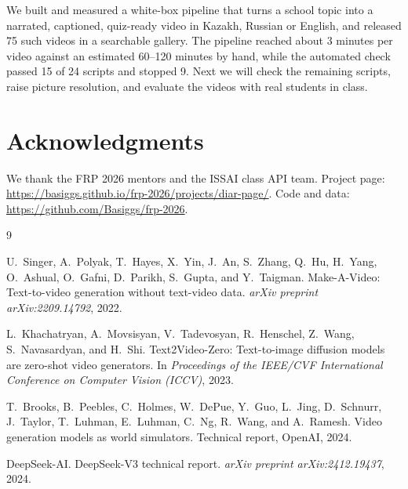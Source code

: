 \documentclass[10pt]{article}
\begin{document}
We built and measured a white-box pipeline that turns a school topic into a narrated, captioned, quiz-ready video in Kazakh, Russian or English, and released 75 such videos in a searchable gallery. The pipeline reached about 3 minutes per video against an estimated 60--120 minutes by hand, while the automated check passed 15 of 24 scripts and stopped 9. Next we will check the remaining scripts, raise picture resolution, and evaluate the videos with real students in class.

\section*{Acknowledgments}

We thank the FRP 2026 mentors and the ISSAI class API team. Project page: \url{https://basiggs.github.io/frp-2026/projects/diar-page/}. Code and data: \url{https://github.com/Basiggs/frp-2026}.

\begin{thebibliography}{9}

U.~Singer, A.~Polyak, T.~Hayes, X.~Yin, J.~An, S.~Zhang, Q.~Hu, H.~Yang, O.~Ashual, O.~Gafni, D.~Parikh, S.~Gupta, and Y.~Taigman.
\newblock Make-A-Video: Text-to-video generation without text-video data.
\newblock \emph{arXiv preprint arXiv:2209.14792}, 2022.

L.~Khachatryan, A.~Movsisyan, V.~Tadevosyan, R.~Henschel, Z.~Wang, S.~Navasardyan, and H.~Shi.
\newblock Text2Video-Zero: Text-to-image diffusion models are zero-shot video generators.
\newblock In \emph{Proceedings of the IEEE/CVF International Conference on Computer Vision (ICCV)}, 2023.

T.~Brooks, B.~Peebles, C.~Holmes, W.~DePue, Y.~Guo, L.~Jing, D.~Schnurr, J.~Taylor, T.~Luhman, E.~Luhman, C.~Ng, R.~Wang, and A.~Ramesh.
\newblock Video generation models as world simulators.
\newblock Technical report, OpenAI, 2024.

DeepSeek-AI.
\newblock DeepSeek-V3 technical report.
\newblock \emph{arXiv preprint arXiv:2412.19437}, 2024.

\end{thebibliography}
\end{document}
